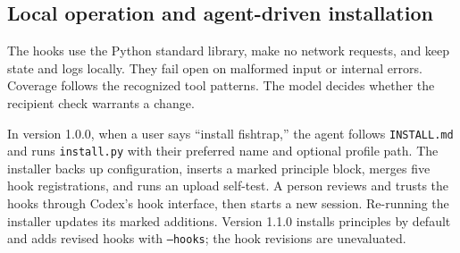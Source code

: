 \subsection{Local operation and agent-driven installation}

The hooks use the Python standard library, make no network requests, and keep state and logs locally. They fail open on malformed input or internal errors. Coverage follows the recognized tool patterns. The model decides whether the recipient check warrants a change.

In version 1.0.0, when a user says ``install fishtrap,'' the agent follows \texttt{INSTALL.md} and runs \texttt{install.py} with their preferred name and optional profile path. The installer backs up configuration, inserts a marked principle block, merges five hook registrations, and runs an upload self-test. A person reviews and trusts the hooks through Codex's hook interface, then starts a new session. Re-running the installer updates its marked additions. Version 1.1.0 installs principles by default and adds revised hooks with \texttt{--hooks}; the hook revisions are unevaluated.
